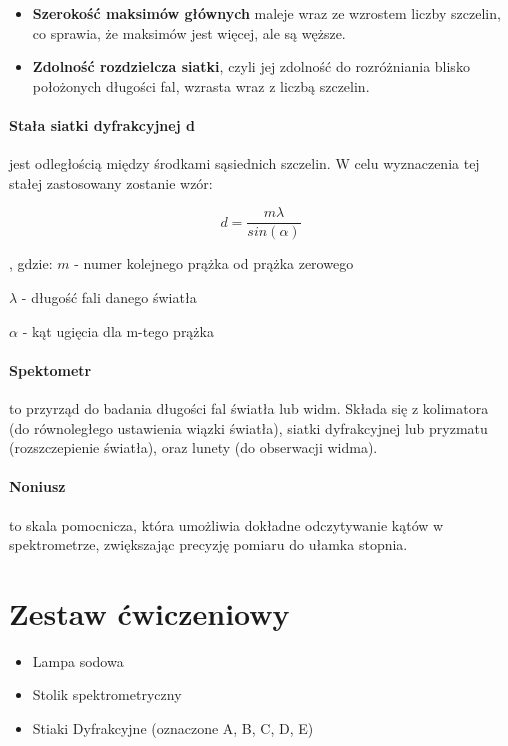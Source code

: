 \documentclass{article}
\begin{document}
\begin{itemize}
    \item  \textbf{Szerokość maksimów głównych} maleje wraz ze wzrostem liczby szczelin, co sprawia, że maksimów jest więcej, ale są węższe.
    \item \textbf{Zdolność rozdzielcza siatki}, czyli jej zdolność do rozróżniania blisko położonych długości fal, wzrasta wraz z liczbą szczelin.
\end{itemize}
\FloatBarrier
\paragraph{Stała siatki dyfrakcyjnej d} jest odległością między środkami sąsiednich szczelin. W celu wyznaczenia tej stałej zastosowany zostanie wzór: 

\begin{equation}
    d = \frac{m \lambda}{sin(\alpha)}
\end{equation}

, gdzie: 
$m$ - numer kolejnego prążka od prążka zerowego

$\lambda$ - długość fali danego światła

$\alpha$ - kąt ugięcia dla m-tego prążka

\paragraph{Spektometr}to przyrząd do badania długości fal światła lub widm. Składa się z kolimatora (do równoległego ustawienia wiązki światła), siatki dyfrakcyjnej lub pryzmatu (rozszczepienie światła), oraz lunety (do obserwacji widma).

\paragraph{Noniusz} to skala pomocnicza, która umożliwia dokładne odczytywanie kątów w spektrometrze, zwiększając precyzję pomiaru do ułamka stopnia.

\FloatBarrier
\newpage

\section*{Zestaw ćwiczeniowy}

\begin{itemize}
    \item Lampa sodowa
    \item Stolik spektrometryczny
    \item Stiaki Dyfrakcyjne (oznaczone A, B, C, D, E)
\end{itemize}
\end{document}
